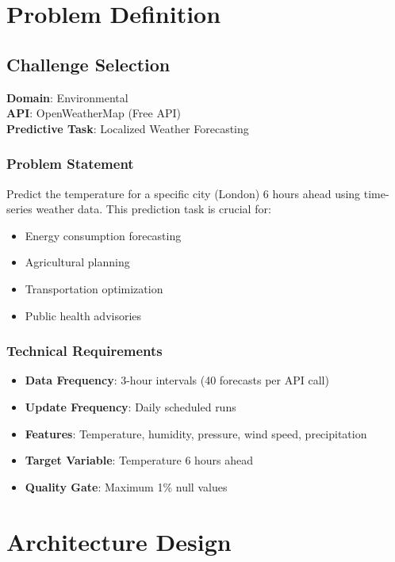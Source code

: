 \documentclass[12pt,a4paper]{article}
\begin{document}
\section{Problem Definition}

\subsection{Challenge Selection}

\textbf{Domain}: Environmental \\
\textbf{API}: OpenWeatherMap (Free API) \\
\textbf{Predictive Task}: Localized Weather Forecasting

\subsubsection{Problem Statement}
Predict the temperature for a specific city (London) 6 hours ahead using time-series weather data. This prediction task is crucial for:
\begin{itemize}
    \item Energy consumption forecasting
    \item Agricultural planning
    \item Transportation optimization
    \item Public health advisories
\end{itemize}

\subsubsection{Technical Requirements}
\begin{itemize}
    \item \textbf{Data Frequency}: 3-hour intervals (40 forecasts per API call)
    \item \textbf{Update Frequency}: Daily scheduled runs
    \item \textbf{Features}: Temperature, humidity, pressure, wind speed, precipitation
    \item \textbf{Target Variable}: Temperature 6 hours ahead
    \item \textbf{Quality Gate}: Maximum 1\% null values
\end{itemize}

\section{Architecture Design}
\end{document}
